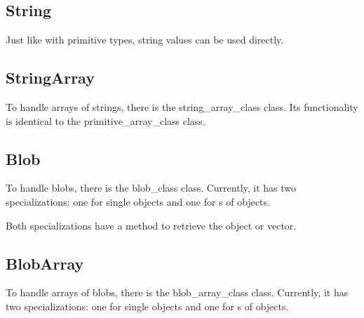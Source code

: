 \subsection{String}
\label{section:member_types:string}

Just like with primitive types, string values can be used directly.





\subsection{StringArray}
\label{section:member_types:string_array}

To handle arrays of strings, there is the \gls{string_array_class} class. Its functionality is identical to the \gls{primitive_array_class} class.





\subsection{Blob}
\label{section:member_types:blob}

To handle blobs, there is the \gls{blob_class} class. Currently, it has two specializations: one for single objects and one for s of objects.



Both specializations have a  method to retrieve the object or vector.



\subsection{BlobArray}
\label{section:member_types:blob_array}

To handle arrays of blobs, there is the \gls{blob_array_class} class. Currently, it has two specializations: one for single objects and one for s of objects.

